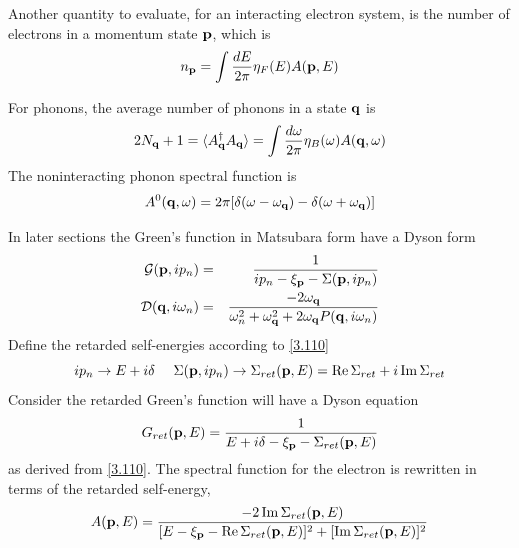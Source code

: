 Another quantity to evaluate, for an interacting electron system, is the number of electrons in a momentum state $\mathbf{p}$, which is
\begin{equation}
  n_{\mathbf{p}} = \int \frac{dE}{2\pi} \eta_F(E) A(\mathbf{p},E) \label{3.135}
\end{equation}

For phonons, the average number of phonons in a state $\mathbf{q}$ is
\begin{equation}
  2N_{\mathbf{q}} +1  = \langle A^\dagger_{\mathbf{q}} A_{\mathbf{q}} \rangle = \int \frac{d\omega}{2\pi} \eta_B(\omega)A(\mathbf{q},\omega) \label{3.136}
\end{equation}
The noninteracting phonon spectral function is
\begin{equation}
  A^0(\mathbf{q},\omega) = 2\pi [\delta(\omega-\omega_{\mathbf{q}}) - \delta(\omega+ \omega_{\mathbf{q}})] \label{3.137}
\end{equation}

In later sections the Green's function in Matsubara form have a Dyson form
\begin{eqnarray}
    \mathcal{G}(\mathbf{p},ip_n) &=& \frac{1}{ip_n -\xi_{\mathbf{p}} -\Sigma(\mathbf{p},ip_n)}     \label{3.138} \\
    \mathcal{D} (\mathbf{q},i\omega_n) &=& \frac{-2\omega_{\mathbf{q}}}{\omega_n^2 + \omega_{\mathbf{q}}^2 +2\omega_{\mathbf{q}} P(\mathbf{q},i\omega_n)} \label{3.139}
\end{eqnarray}
Define the retarded self-energies according to \eqref{3.110}
\begin{equation}
  ip_n \to E + i\delta ~ ~ ~ ~ \Sigma(\mathbf{p},ip_n) \to \Sigma_{ret}(\mathbf{p},E) = \Re \Sigma_{ret} + i \Im \Sigma_{ret}    \label{3.140}
\end{equation}
Consider the retarded Green's function will have a Dyson equation
\begin{equation}
  G_{ret}(\mathbf{p},E) = \frac{1}{E+i\delta-\xi_{\mathbf{p}} - \Sigma_{ret}(\mathbf{p},E)} \label{3.141}
\end{equation}
as derived from \eqref{3.110}.
The spectral function for the electron is rewritten in terms of the retarded self-energy,
\begin{equation}
  A(\mathbf{p},E) = \frac{-2 \Im \Sigma_{ret}(\mathbf{p},E)}{[E-\xi_{\mathbf{p}} - \Re \Sigma_{ret}(\mathbf{p},E)]^2 + [\Im\Sigma_{ret}(\mathbf{p},E)]^2}  \label{3.142}
\end{equation}

